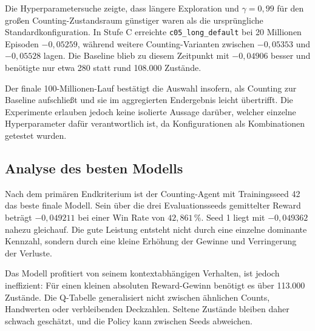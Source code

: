 Die Hyperparametersuche zeigte, dass längere Exploration und
$\gamma=0{,}99$ für den großen Counting-Zustandsraum günstiger waren
als die ursprüngliche Standardkonfiguration. In Stufe C erreichte
\texttt{c05\_long\_default} bei 20 Millionen Episoden $-0{,}05259$,
während weitere Counting-Varianten zwischen $-0{,}05353$ und
$-0{,}05528$ lagen. Die Baseline blieb zu diesem Zeitpunkt mit
$-0{,}04906$ besser und benötigte nur etwa 280 statt rund 108.000 Zustände.

Der finale 100-Millionen-Lauf bestätigt die Auswahl insofern, als
Counting zur Baseline aufschließt und sie im aggregierten Endergebnis
leicht übertrifft. Die Experimente erlauben jedoch keine isolierte
Aussage darüber, welcher einzelne Hyperparameter dafür verantwortlich
ist, da Konfigurationen als Kombinationen getestet wurden.

\subsection{Analyse des besten Modells}

Nach dem primären Endkriterium ist der Counting-Agent mit
Trainingsseed 42 das beste finale Modell. Sein über die drei
Evaluationsseeds gemittelter Reward beträgt $-0{,}049211$ bei einer
Win Rate von $42{,}861\,\%$. Seed 1 liegt mit $-0{,}049362$ nahezu
gleichauf. Die gute Leistung entsteht nicht durch eine einzelne
dominante Kennzahl, sondern durch eine kleine Erhöhung der Gewinne
und Verringerung der Verluste.

Das Modell profitiert von seinem kontextabhängigen Verhalten, ist
jedoch ineffizient: Für einen kleinen absoluten Reward-Gewinn
benötigt es über 113.000 Zustände. Die Q-Tabelle generalisiert nicht
zwischen ähnlichen Counts, Handwerten oder verbleibenden Deckzahlen.
Seltene Zustände bleiben daher schwach geschätzt, und die Policy kann
zwischen Seeds abweichen.
